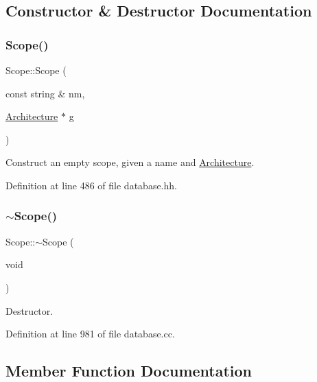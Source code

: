 \subsection{Constructor \& Destructor Documentation}
\mbox{\label{class_scope_a203cfd8813735894486ed2c57f378f1e}} 
\subsubsection{\texorpdfstring{Scope()}{Scope()}}
{\footnotesize\ttfamily Scope\+::\+Scope (\begin{DoxyParamCaption}\item[{const string \&}]{nm,  }\item[{\mbox{\hyperlink{class_architecture}{Architecture}} $\ast$}]{g }\end{DoxyParamCaption})\hspace{0.3cm}{\ttfamily [inline]}}



Construct an empty scope, given a name and \mbox{\hyperlink{class_architecture}{Architecture}}. 



Definition at line 486 of file database.\+hh.

\mbox{\label{class_scope_a571dad0bea947a7c5c1cfea083733963}} 
\subsubsection{\texorpdfstring{$\sim$Scope()}{~Scope()}}
{\footnotesize\ttfamily Scope\+::$\sim$\+Scope (\begin{DoxyParamCaption}\item[{void}]{ }\end{DoxyParamCaption})\hspace{0.3cm}{\ttfamily [virtual]}}



Destructor. 



Definition at line 981 of file database.\+cc.



\subsection{Member Function Documentation}
\mbox{\label{class_scope_a4dcaf595e4437d91af6a243ef0d49640}} 
